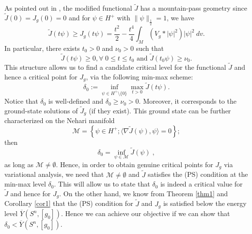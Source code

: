 \documentclass[11pt]{article}
\begin{document}
{ 
\noindent
As pointed out in \cite{MMM}, the modified functional $\tilde{J}$ has a mountain-pass geometry since $\tilde{J}(0)=J_{g}(0)=0$ and for $\psi \in H^{+}$ with $\|\psi\|_{\frac{1}{2}}=1$, we have
$$\tilde{J}(t\psi)\geq J_{g}(t\psi)=\frac{t^{2}}{2}-\frac{t^{4}}{4}\int_{M} (V_{g}*|\psi|^{2})|\psi|^{2}\ dv.$$
In particular, there exists $t_{0}>0$ and $\nu_{0}>0$ such that 
$$\tilde{J}(t\psi)\geq 0, \forall \;  0\leq t\leq t_{0} \text{ and } \tilde{J}(t_{0}\psi)\geq \nu_{0}.$$
 This structure allows us to find a candidate critical level for the functional $\tilde{J}$ and hence a critical point for $J_{g}$, via the following min-max scheme:
$$\delta_{0}:=\inf_{\psi \in H^{+}\setminus\{0\}}\max_{t>0}\tilde{J}(t\psi).$$
Notice that $\delta_{0}$ is well-defined and $\delta_{0}\geq \nu_{0}>0$. Moreover, it corresponds to the ground-state solutions of $\tilde{J}_{g}$ (if they exist). This ground state can be further characterized on the Nehari manifold
$$\mathcal{M}=\left\{\psi \in H^{+}; \langle \nabla \tilde{J}(\psi),\psi\rangle=0 \right\}; $$
then
\begin{equation}\label{delta0}
\delta_{0}=\inf_{\psi\in \mathcal{M}} \tilde{J}(\psi) \; ,
\end{equation}
as long as $\mathcal{M}\not=\emptyset$. Hence, in order to obtain genuine critical points for $J_{g}$ via variational analysis, we need that $\mathcal{M}\not=\emptyset$ and $\tilde{J}$ satisfies the (PS) condition at the min-max level $\delta_{0}$. This will allow us to state that $\delta_{0}$ is indeed a critical value for $\tilde{J}$ and hence for $J_{g}$. On the other hand, we know from Theorem \ref{thm1} and Corollary \ref{cor1} that the (PS) condition for $\tilde{J}$ and $J_{g}$ is satisfied below the energy level $\overline{Y}(S^{n},[g_{0}])$. Hence we can achieve our objective if we can show that $\delta_{0}<\overline{Y}(S^{n},[g_{0}])$.



}
\end{document}
